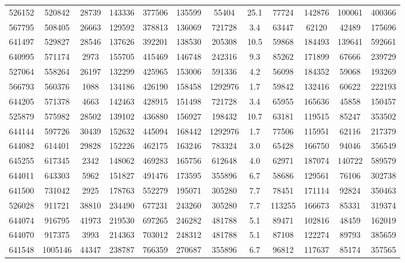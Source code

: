 \documentclass[DM,lsstdraft,toc,usenatbib]{lsstdoc}
\begin{document}
\begin{landscape}
\begin{longtable}{cccccccccccc}
526152 & 520842 & 28739 & 143336 & 377506 & 135599 & 55404 & 25.1 & 77724 & 142876 & 100061 & 400366 \\
567795 & 508405 & 26663 & 129592 & 378813 & 136069 & 721728 & 3.4 & 63447 & 62120 & 42489 & 175696 \\
641497 & 529827 & 28546 & 137626 & 392201 & 138530 & 205308 & 10.5 & 59868 & 184493 & 139641 & 592661 \\
640995 & 571174 & 2973 & 155705 & 415469 & 146748 & 242316 & 9.3 & 85262 & 171899 & 67666 & 239729 \\
527064 & 558264 & 26197 & 132299 & 425965 & 153006 & 591336 & 4.2 & 56098 & 184352 & 59068 & 193269 \\
566793 & 560376 & 1088 & 134186 & 426190 & 158458 & 1292976 & 1.7 & 59842 & 132416 & 60622 & 222193 \\
644205 & 571378 & 4663 & 142463 & 428915 & 151498 & 721728 & 3.4 & 65955 & 165636 & 45858 & 150457 \\
525879 & 575982 & 28502 & 139102 & 436880 & 156927 & 198432 & 10.7 & 63181 & 119515 & 85247 & 353502 \\
644144 & 597726 & 30439 & 152632 & 445094 & 168442 & 1292976 & 1.7 & 77506 & 115951 & 62116 & 217379 \\
644082 & 614401 & 29828 & 152226 & 462175 & 163246 & 783324 & 3.0 & 65428 & 166750 & 94046 & 356549 \\
645255 & 617345 & 2342 & 148062 & 469283 & 165756 & 612648 & 4.0 & 62971 & 187074 & 140722 & 589579 \\
644011 & 643303 & 5962 & 151827 & 491476 & 173595 & 355896 & 6.7 & 58686 & 129561 & 76106 & 302738 \\
641500 & 731042 & 2925 & 178763 & 552279 & 195071 & 305280 & 7.7 & 78451 & 171114 & 92824 & 350463 \\
526028 & 911721 & 38810 & 234490 & 677231 & 243260 & 305280 & 7.7 & 113255 & 166673 & 85331 & 319374 \\
644074 & 916795 & 41973 & 219530 & 697265 & 246282 & 481788 & 5.1 & 89471 & 102816 & 48459 & 162019 \\
644070 & 917375 & 3993 & 214363 & 703012 & 248312 & 481788 & 5.1 & 87108 & 122274 & 89793 & 385659 \\
641548 & 1005146 & 44347 & 238787 & 766359 & 270687 & 355896 & 6.7 & 96812 & 117637 & 85174 & 357565 \\

\hline


\end{longtable}
\end{landscape}
\end{document}

